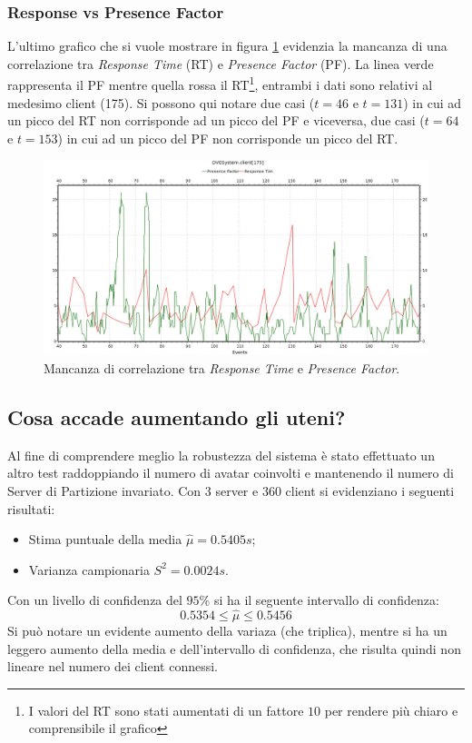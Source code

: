 \documentclass[a4paper, 11pt, oneside]{book}
\theoremstyle{definition}
\theoremstyle{remark}
\begin{document}
\subsubsection{Response vs Presence Factor}
L'ultimo grafico che si vuole mostrare in figura \ref{responseVSPresence}
evidenzia la mancanza di una correlazione tra \emph{Response Time} (RT) e
\emph{Presence Factor} (PF). La linea verde rappresenta il PF mentre quella
rossa il RT\footnote{I valori del RT sono stati aumentati di un fattore $10$ per
rendere più chiaro e comprensibile il grafico}, entrambi i dati sono relativi al
medesimo client (175).
Si possono qui notare due casi ($t = 46$ e $t = 131$) in cui ad un picco
del RT non corrisponde ad un picco del PF e viceversa, due casi
($t = 64$ e $t = 153$) in cui ad un picco del PF non corrisponde un picco
del RT.

\begin{figure}
\begin{center}
\includegraphics[scale=0.4]{responseVSpresence.jpeg}
\end{center}
\caption{Mancanza di correlazione tra \emph{Response Time} e
\emph{Presence Factor}.}
\label{responseVSPresence}
\end{figure}

\subsection{Cosa accade aumentando gli uteni?}
Al fine di comprendere meglio la robustezza del sistema è stato effettuato
un altro test raddoppiando il numero di avatar coinvolti e mantenendo il numero
di Server di Partizione invariato. Con $3$ server e $360$ client si evidenziano
i seguenti risultati:
\begin{itemize}
\item
Stima puntuale della media $\hat{\mu} = 0.5405s$;
\item
Varianza campionaria $S^2 = 0.0024s$.
\end{itemize}
Con un livello di confidenza del $95$\% si ha il seguente intervallo di
confidenza:
\[
0.5354 \le \hat{\mu} \le 0.5456
\]
Si può notare un evidente aumento della variaza (che triplica), mentre si ha
un leggero aumento della media e dell'intervallo di confidenza, che risulta
quindi non lineare nel numero dei client connessi.
\end{document}
